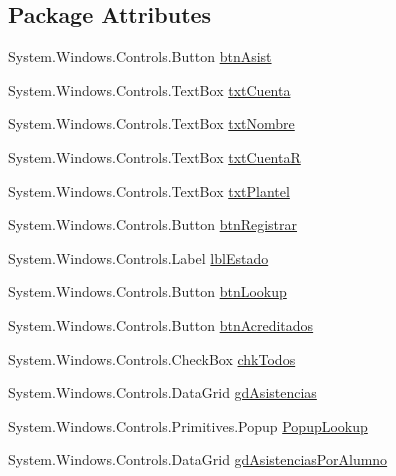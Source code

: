 \subsection*{Package Attributes}
\begin{DoxyCompactItemize}
\item 
System.\-Windows.\-Controls.\-Button \hyperlink{class_asistencias__wpf_1_1_main_window_a65c34d321ad5d831ae14e80205d153b8}{btn\-Asist}
\item 
System.\-Windows.\-Controls.\-Text\-Box \hyperlink{class_asistencias__wpf_1_1_main_window_a52e76fc15be974c00138b13ab7e19b44}{txt\-Cuenta}
\item 
System.\-Windows.\-Controls.\-Text\-Box \hyperlink{class_asistencias__wpf_1_1_main_window_acd918b065d257146f683ff317be832a6}{txt\-Nombre}
\item 
System.\-Windows.\-Controls.\-Text\-Box \hyperlink{class_asistencias__wpf_1_1_main_window_a4ce5343faaf6dc02bc33f5da846cd4db}{txt\-Cuenta\-R}
\item 
System.\-Windows.\-Controls.\-Text\-Box \hyperlink{class_asistencias__wpf_1_1_main_window_a20520a2029311127a68cc320e5a1aed4}{txt\-Plantel}
\item 
System.\-Windows.\-Controls.\-Button \hyperlink{class_asistencias__wpf_1_1_main_window_a37ce519d4dc242993a180c9ec48581f6}{btn\-Registrar}
\item 
System.\-Windows.\-Controls.\-Label \hyperlink{class_asistencias__wpf_1_1_main_window_a225a06fc8dd74f56e03caad3b7eaf6ab}{lbl\-Estado}
\item 
System.\-Windows.\-Controls.\-Button \hyperlink{class_asistencias__wpf_1_1_main_window_a06d0d015783f1332649608fd2a84d459}{btn\-Lookup}
\item 
System.\-Windows.\-Controls.\-Button \hyperlink{class_asistencias__wpf_1_1_main_window_a926b718586c2787f19ddaa4001911d1b}{btn\-Acreditados}
\item 
System.\-Windows.\-Controls.\-Check\-Box \hyperlink{class_asistencias__wpf_1_1_main_window_adcd4add51c03081da4c3c0cc80125b45}{chk\-Todos}
\item 
System.\-Windows.\-Controls.\-Data\-Grid \hyperlink{class_asistencias__wpf_1_1_main_window_a813953ed3cd32fbaea64c551ae2728c9}{gd\-Asistencias}
\item 
System.\-Windows.\-Controls.\-Primitives.\-Popup \hyperlink{class_asistencias__wpf_1_1_main_window_ab76400422a21298f8055dd60e6d922c7}{Popup\-Lookup}
\item 
System.\-Windows.\-Controls.\-Data\-Grid \hyperlink{class_asistencias__wpf_1_1_main_window_ae0a45b8720275659efc30b621e482e40}{gd\-Asistencias\-Por\-Alumno}
\end{DoxyCompactItemize}
